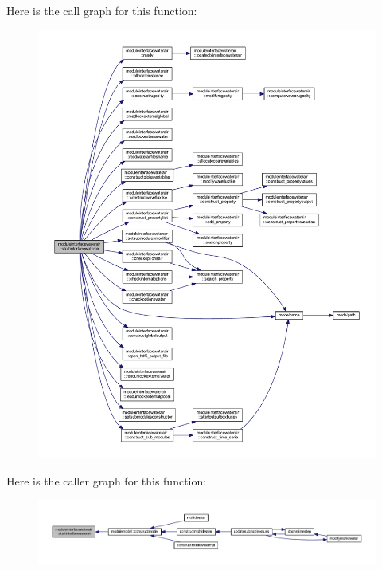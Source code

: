 Here is the call graph for this function\+:\nopagebreak
\begin{figure}[H]
\begin{center}
\leavevmode
\includegraphics[width=350pt]{namespacemoduleinterfacewaterair_a1d15121ff2d6a7ec0e45dffd0506037a_cgraph}
\end{center}
\end{figure}
Here is the caller graph for this function\+:\nopagebreak
\begin{figure}[H]
\begin{center}
\leavevmode
\includegraphics[width=350pt]{namespacemoduleinterfacewaterair_a1d15121ff2d6a7ec0e45dffd0506037a_icgraph}
\end{center}
\end{figure}
\mbox{\label{namespacemoduleinterfacewaterair_a657983e875ad047622b576288b98dd2e}} 
